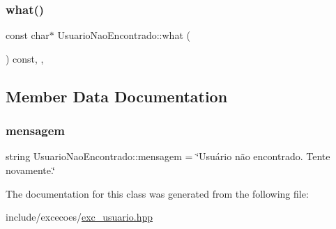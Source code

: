 \subsubsection{\texorpdfstring{what()}{what()}}
{\footnotesize\ttfamily const char$\ast$ Usuario\+Nao\+Encontrado\+::what (\begin{DoxyParamCaption}{ }\end{DoxyParamCaption}) const\hspace{0.3cm}{\ttfamily [inline]}, {\ttfamily [override]}, {\ttfamily [noexcept]}}



\subsection{Member Data Documentation}
\mbox{\label{classUsuarioNaoEncontrado_abad07fdf50cec90997957a8282d29be4}} 
\subsubsection{\texorpdfstring{mensagem}{mensagem}}
{\footnotesize\ttfamily string Usuario\+Nao\+Encontrado\+::mensagem = \char`\"{}Usuário não encontrado. Tente novamente.\char`\"{}\hspace{0.3cm}{\ttfamily [private]}}



The documentation for this class was generated from the following file\+:\begin{DoxyCompactItemize}
\item 
include/excecoes/\hyperlink{exc__usuario_8hpp}{exc\+\_\+usuario.\+hpp}\end{DoxyCompactItemize}
